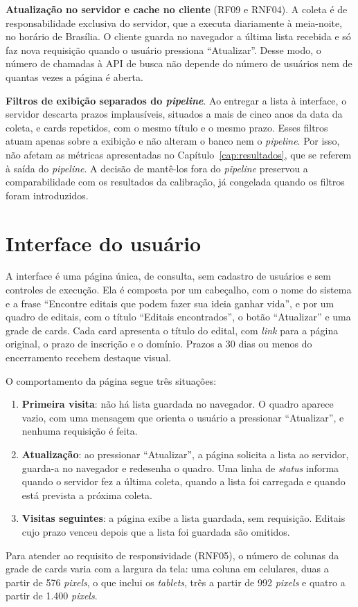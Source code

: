 \textbf{Atualização no servidor e cache no cliente} (RF09 e RNF04). A coleta é
de responsabilidade exclusiva do servidor, que a executa diariamente à
meia-noite, no horário de Brasília. O
cliente guarda no navegador a última lista recebida e só faz nova requisição
quando o usuário pressiona ``Atualizar''. Desse modo, o número de chamadas à
API de busca não depende do número de usuários nem de quantas vezes a página é
aberta.

\textbf{Filtros de exibição separados do \textit{pipeline}}. Ao entregar a
lista à interface, o servidor descarta prazos implausíveis, situados a mais de
cinco anos da data da coleta, e cards repetidos, com o mesmo título e o mesmo
prazo. Esses filtros atuam apenas sobre a exibição e não alteram o banco nem o
\textit{pipeline}. Por isso, não afetam as métricas apresentadas no
Capítulo~\ref{cap:resultados}, que se referem à saída do \textit{pipeline}.
A decisão de mantê-los fora do \textit{pipeline} preservou a comparabilidade
com os resultados da calibração, já congelada quando os filtros foram
introduzidos.

\section{Interface do usuário}
\label{sec:proj_interface}

A interface é uma página única, de consulta, sem cadastro de usuários e sem
controles de execução. Ela é composta por um cabeçalho, com o nome do sistema
e a frase ``Encontre editais que podem fazer sua ideia ganhar vida'', e por um
quadro de editais, com o título ``Editais encontrados'', o botão
``Atualizar'' e uma grade de cards. Cada card apresenta o título do edital,
com \textit{link} para a página original, o prazo de inscrição e o domínio.
Prazos a 30 dias ou menos do encerramento recebem destaque visual.

O comportamento da página segue três situações:

\begin{enumerate}
  \item \textbf{Primeira visita}: não há lista guardada no navegador. O quadro
    aparece vazio, com uma mensagem que orienta o usuário a pressionar
    ``Atualizar'', e nenhuma requisição é feita.
  \item \textbf{Atualização}: ao pressionar ``Atualizar'', a página solicita a
    lista ao servidor, guarda-a no navegador e redesenha o quadro. Uma linha de
    \textit{status} informa quando o servidor fez a última coleta, quando a
    lista foi carregada e quando está prevista a próxima coleta.
  \item \textbf{Visitas seguintes}: a página exibe a lista guardada, sem
    requisição. Editais cujo prazo venceu depois que a lista foi guardada são
    omitidos.
\end{enumerate}

Para atender ao requisito de responsividade (RNF05), o número de colunas da
grade de cards varia com a largura da tela: uma coluna em celulares, duas a
partir de 576 \textit{pixels}, o que inclui os \textit{tablets}, três a partir
de 992 \textit{pixels} e quatro a partir de 1.400 \textit{pixels}.
